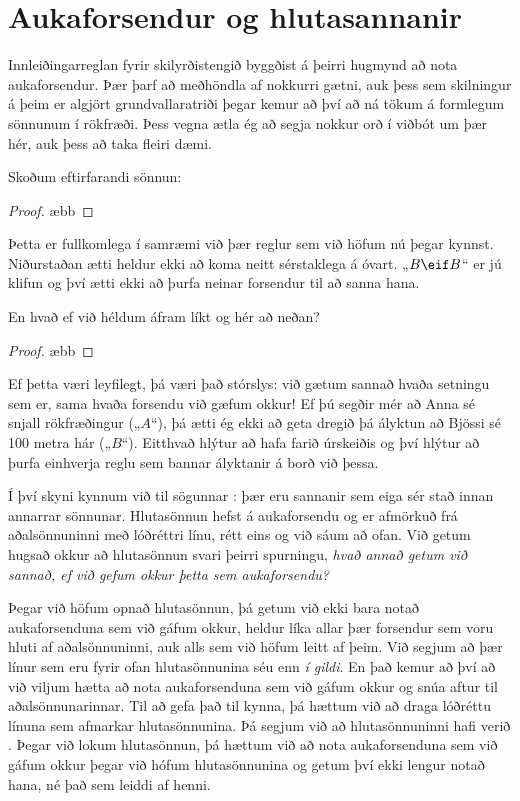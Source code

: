 \section{Aukaforsendur og hlutasannanir}

Innleiðingarreglan fyrir skilyrðistengið byggðist á þeirri hugmynd að nota aukaforsendur. Þær þarf að meðhöndla af nokkurri gætni, auk þess sem skilningur á þeim er algjört grundvallaratriði þegar kemur að því að ná tökum á formlegum sönnunum í rökfræði. Þess vegna ætla ég að segja nokkur orð í viðbót um þær hér, auk þess að taka fleiri dæmi. 

Skoðum eftirfarandi sönnun:
\begin{proof}
	\open
		 \ae{bb}
	\close
\end{proof}
Þetta er fullkomlega í samræmi við þær reglur sem við höfum nú þegar kynnst. Niðurstaðan ætti heldur ekki að koma neitt sérstaklega á óvart. „$B\eif B$“ er jú klifun og því ætti ekki að þurfa neinar forsendur til að sanna hana.

En hvað ef við héldum áfram líkt og hér að neðan?
\begin{proof}
	\open
		 \ae{bb}
	\close
\end{proof}
Ef þetta væri leyfilegt, þá væri það stórslys: við gætum sannað hvaða setningu sem er, sama hvaða forsendu við gæfum okkur! Ef þú segðir mér að Anna sé snjall rökfræðingur („$A$“), þá ætti ég ekki að geta dregið þá ályktun að Bjössi sé 100 metra hár („$B$“). Eitthvað hlýtur að hafa farið úrskeiðis og því hlýtur að þurfa einhverja reglu sem bannar ályktanir á borð við þessa. 

Í því skyni kynnum við til sögunnar : þær eru sannanir sem eiga sér stað innan annarrar sönnunar. Hlutasönnun hefst á aukaforsendu og er afmörkuð frá aðalsönnuninni með lóðréttri línu, rétt eins og við sáum að ofan. Við getum hugsað okkur að hlutasönnun svari þeirri spurningu, \emph{hvað annað getum við sannað, ef við gefum okkur þetta sem aukaforsendu?}

Þegar við höfum opnað hlutasönnun, þá getum við ekki bara notað aukaforsenduna sem við gáfum okkur, heldur líka allar þær forsendur sem voru hluti af aðalsönnuninni, auk alls sem við höfum leitt af þeim. Við segjum að þær línur sem eru fyrir ofan hlutasönnunina séu enn \emph{í gildi}. En það kemur að því að við viljum hætta að nota aukaforsenduna sem við gáfum okkur og snúa aftur til aðalsönnunarinnar. Til að gefa það til kynna, þá hættum við að draga lóðréttu línuna sem afmarkar hlutasönnunina. Þá segjum við að hlutasönnuninni hafi verið . Þegar við lokum hlutasönnun, þá hættum við að nota aukaforsenduna sem við gáfum okkur þegar við hófum hlutasönnunina og getum því ekki lengur notað hana, né það sem leiddi af henni.


